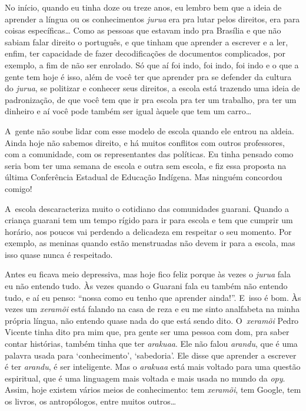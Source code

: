 No início, quando eu tinha doze ou treze anos, eu lembro bem que a ideia
de aprender a língua ou os conhecimentos \emph{jurua} era pra lutar pelos
direitos, era para coisas específicas\ldots{} Como as pessoas que estavam
indo pra Brasília e que não sabiam falar direito o português, e que
tinham que aprender a escrever e a ler, enfim, ter capacidade de fazer
decodificações de documentos complicados, por exemplo, a fim de não ser
enrolado. Só que aí foi indo, foi indo, foi indo e o que a gente tem
hoje é isso, além de você ter que aprender pra se defender da cultura
do \emph{jurua}, se politizar e conhecer seus direitos, a escola está trazendo
uma ideia de padronização, de que você tem que ir pra escola pra ter um
trabalho, pra ter um dinheiro e aí você pode também ser igual àquele
que tem um carro\ldots{}

A~gente não soube lidar com esse modelo de escola quando ele entrou na
aldeia. Ainda hoje não sabemos direito, e há muitos conflitos com
outros professores, com a comunidade, com os representantes das
políticas. Eu tinha pensado como seria bom ter uma semana de escola e
outra sem escola, e fiz essa proposta na última Conferência Estadual de
Educação Indígena. Mas ninguém concordou comigo!

A~escola descaracteriza muito o cotidiano das comunidades guarani.
Quando a criança guarani tem um tempo rígido para ir para escola e tem
que cumprir um horário, aos poucos vai perdendo a delicadeza em
respeitar o seu momento. Por exemplo, as meninas quando estão
menstruadas não devem ir para a escola, mas isso quase nunca é
respeitado.

Antes eu ficava meio depressiva, mas hoje fico feliz porque às vezes o
\emph{jurua} fala eu não entendo tudo. Às vezes quando o Guarani fala eu
também não entendo tudo, e aí eu penso: ``nossa como eu tenho que
aprender ainda!''. E~isso é bom. Às vezes um \emph{xeramõi} está falando na
casa de reza e eu me sinto analfabeta na minha própria língua, não
entendo quase nada do que está sendo dito. O~\emph{xeramõi} Pedro Vicente
tinha dito pra mim que, pra gente ser uma pessoa com dom, pra saber
contar histórias, também tinha que ter \emph{arakuaa}. Ele não falou \emph{arandu},
que é uma palavra usada para ‘conhecimento’, ‘sabedoria’. Ele disse que
aprender a escrever é ter \emph{arandu}, é ser inteligente. Mas o \emph{arakuaa} está
mais voltado para uma questão espiritual, que é uma linguagem mais
voltada e mais usada no mundo da \emph{opy}. Assim, hoje existem vários meios
de conhecimento: tem \emph{xeramõi}, tem Google, tem os livros, os
antropólogos, entre muitos outros\ldots{}

